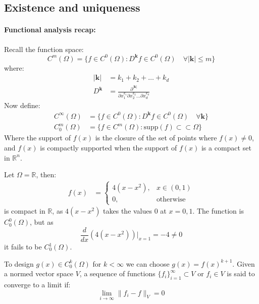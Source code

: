 \subsection{Existence and uniqueness}

\paragraph{Functional analysis recap:} Recall the function space:
\[
    C^m(\Omega) = \{f \in C^0(\Omega) : D^{\mathbf{k}} f \in C^0(\Omega) \quad \forall |\mathbf{k}| \leq m\}
\]
where:
\begin{align*}
    |\mathbf{k}|   & = k_1 + k_2 + \ldots + k_d                                                                        \\
    D^{\mathbf{k}} & = \frac{\partial^{|\mathbf{k}|}}{\partial x_1^{k_1} \partial x_2^{k_2} \ldots \partial x_d^{k_d}}
\end{align*}
Now define:
\begin{align*}
    C^\infty(\Omega) & = \{ f \in C^0(\Omega) : D^{\mathbf{k}} f \in C^0(\Omega) \quad \forall \mathbf{k} \} \tag{infinitly smooth} \\
    C_0^m(\Omega)    & = \{ f \in C^m(\Omega) : \text{supp}(f) \subset \subset \Omega \} \tag{compact support}
\end{align*}
Where the support of $f(x)$ is the closure of the set of points where $f(x) \neq 0$, and $f(x)$ is compactly supported when the support of $f(x)$ is a compact set in $\mathbb{R}^n$.

\begin{example}{}{}
    Let $\Omega = \mathbb{R}$, then:
    \begin{align*}
        f(x) & =
        \begin{cases}
            4(x - x^2), & x \in (0, 1)     \\
            0,          & \text{otherwise}
        \end{cases}
    \end{align*}
    is compact in $\mathbb{R}$, as $4(x - x^2)$ takes the values $0$ at $x = 0, 1$. The function is $C_0^0(\Omega)$, but as
    \[
        \frac{d}{dx}\left(4(x - x^2)\right)\vert_{x = 1} = -4 \neq 0
    \]
    it fails to be $C_0^1(\Omega)$.
\end{example}

To design $g(x) \in C_0^k(\Omega)$ for $k < \infty$ we can choose $g(x) = f(x)^{k+1}$.
Given a normed vector space $V$, a sequence of functions $\{f_i\}_{i=1}^\infty \subset V$ or $f_i \in V$ is said to converge to a limit if:
\[
    \lim_{i \to \infty} \|f_i - f\|_V = 0
\]


